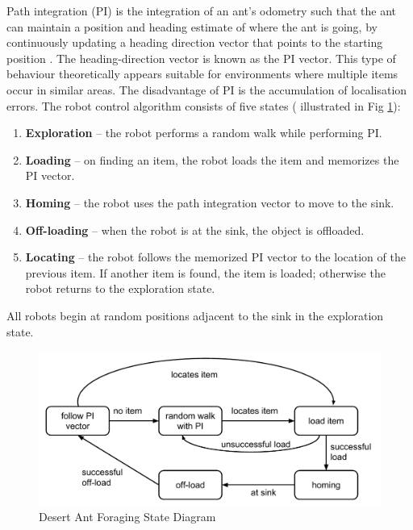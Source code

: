 Path integration (PI) is the integration of an ant's odometry such that the ant can maintain a position and heading estimate of where the ant is going, by continuously updating a heading direction vector that points to the starting position \cite{ronacher2008path}. The heading-direction vector is known as the PI vector. This type of behaviour theoretically appears suitable for environments where multiple items occur in similar areas. The disadvantage of PI is the accumulation of localisation errors. The robot control algorithm consists of five states ( illustrated in Fig \ref{fig:desertantstate}):

\begin{enumerate}
	\item\textbf{Exploration} -- the robot performs a random walk while performing PI.
	\item\textbf{Loading} -- on finding an item, the robot loads the item and memorizes the PI vector.
	\item\textbf{Homing } -- the robot uses the path integration vector to move to the sink.
	\item\textbf{Off-loading} -- when the robot is at the sink, the object is offloaded.
	\item\textbf{Locating} -- the robot follows the memorized PI vector to the location of the previous item. If another item is found, the item is loaded; otherwise the robot returns to the exploration state. 
\end{enumerate}
All robots begin at random positions adjacent to the sink in the exploration state.

\begin{figure}[h]
	\centering
	\includegraphics[width=\textwidth]{chapters/chapter3/figures/DesertAntState.pdf}
	\caption{Desert Ant Foraging State Diagram}
	\label{fig:desertantstate}
\end{figure}
	


